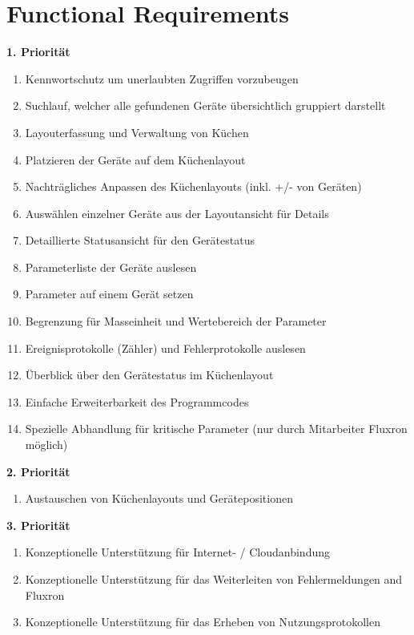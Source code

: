 
\section{Functional Requirements}
\label{sec:Functional Requirements}

\textbf{1. Priorität}
\begin{enumerate}
		\item Kennwortschutz um unerlaubten Zugriffen vorzubeugen
        \item Suchlauf, welcher alle gefundenen Geräte übersichtlich gruppiert darstellt
        \item Layouterfassung und Verwaltung von Küchen
        \item Platzieren der Geräte auf dem Küchenlayout
        \item Nachträgliches Anpassen des Küchenlayouts (inkl. +/- von Geräten)
        \item Auswählen einzelner Geräte aus der Layoutansicht für Details
        \item Detaillierte Statusansicht für den Gerätestatus
        \item Parameterliste der Geräte auslesen
		\item Parameter auf einem Gerät setzen
		\item Begrenzung für Masseinheit und Wertebereich der Parameter
        \item Ereignisprotokolle (Zähler) und Fehlerprotokolle auslesen
        \item Überblick über den Gerätestatus im Küchenlayout
        \item Einfache Erweiterbarkeit des Programmcodes
        \item Spezielle Abhandlung für kritische Parameter (nur durch Mitarbeiter Fluxron möglich)
	\end{enumerate}
\textbf{2. Priorität}
	\begin{enumerate}[resume]
        \item Austauschen von Küchenlayouts und Gerätepositionen
	\end{enumerate}
\textbf{3. Priorität}
	\begin{enumerate}[resume]
		\item Konzeptionelle Unterstützung für Internet- / Cloudanbindung
        \item Konzeptionelle Unterstützung für das Weiterleiten von Fehlermeldungen and Fluxron
        \item Konzeptionelle Unterstützung für das Erheben von Nutzungsprotokollen
\end{enumerate}
